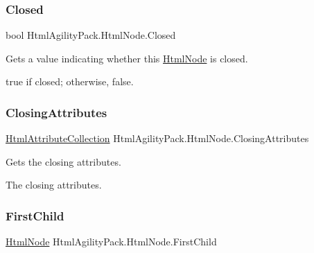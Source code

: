 \subsubsection{\texorpdfstring{Closed}{Closed}}
{\footnotesize\ttfamily bool Html\+Agility\+Pack.\+Html\+Node.\+Closed\hspace{0.3cm}{\ttfamily [get]}}



Gets a value indicating whether this \hyperlink{class_html_agility_pack_1_1_html_node}{Html\+Node} is closed. 

{\ttfamily true} if closed; otherwise, {\ttfamily false}.\mbox{\label{class_html_agility_pack_1_1_html_node_af69a960d1ba040bb3c3ca20de77c9985}} 
\subsubsection{\texorpdfstring{Closing\+Attributes}{ClosingAttributes}}
{\footnotesize\ttfamily \hyperlink{class_html_agility_pack_1_1_html_attribute_collection}{Html\+Attribute\+Collection} Html\+Agility\+Pack.\+Html\+Node.\+Closing\+Attributes\hspace{0.3cm}{\ttfamily [get]}}



Gets the closing attributes. 

The closing attributes.\mbox{\label{class_html_agility_pack_1_1_html_node_a7560c3d7ddfa1e3b022bb3a6af05f4b2}} 
\subsubsection{\texorpdfstring{First\+Child}{FirstChild}}
{\footnotesize\ttfamily \hyperlink{class_html_agility_pack_1_1_html_node}{Html\+Node} Html\+Agility\+Pack.\+Html\+Node.\+First\+Child\hspace{0.3cm}{\ttfamily [get]}}



